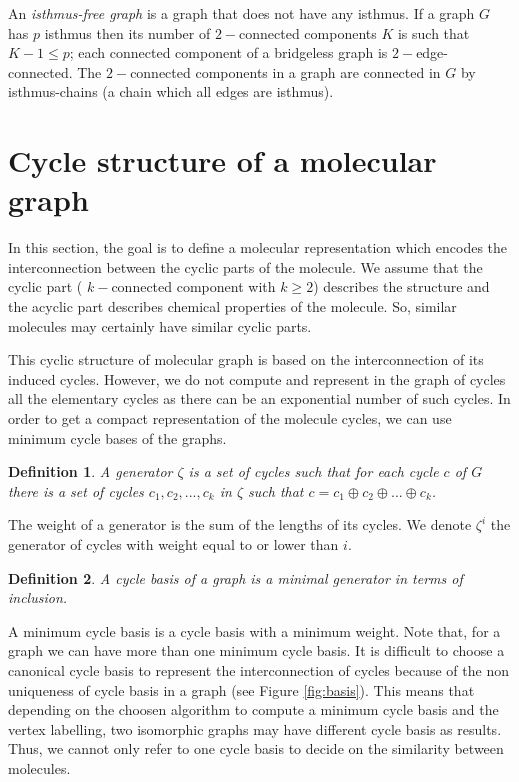 \documentclass[journal=jacsat,manuscript=article]{achemso}
\newtheorem{definition}{Definition}
\begin{document}
 An \textit{isthmus-free graph} is a graph that does not have any isthmus. If a graph $G$ has $p$ isthmus then its number of $2-$connected components $K$ is such that $K-1 \leq p$; each connected component of a bridgeless graph is $2-$edge-connected. The $2-$connected components in a graph are connected in $G$ by  isthmus-chains (a chain which all edges are isthmus).



\section{Cycle structure of a molecular graph}

 In this section, the goal is to define a molecular representation which encodes the interconnection between the cyclic parts of the molecule. We assume that the cyclic part ( $k-$connected component with $k \geq 2$) describes the structure and the acyclic part describes chemical properties of the molecule. So, similar molecules may certainly have similar cyclic parts. 

This cyclic structure of molecular graph is based on the interconnection of its induced cycles. However, we do not compute and represent in the graph of cycles all the elementary cycles as there can be an exponential number of such cycles. In order to get a compact representation of the molecule cycles, we can use minimum cycle bases\cite{Horton1987} of the graphs.

\begin{definition}
A generator $\zeta$ is a set of cycles such that for each cycle $c$ of $G$ there is a set of cycles $c_1,c_2,...,c_k$ in $ \zeta $ such that $c = c_1 \oplus c_2 \oplus  ... \oplus c_k$.
\end{definition}

The weight of a generator is the sum of the lengths of its cycles. We denote $\zeta^i$ the generator of cycles with weight equal to or lower than $i$.

\begin{definition} 
A cycle basis of a graph is a minimal generator in terms of inclusion. 
\end{definition}

A minimum cycle basis is a cycle basis with a minimum weight. Note that, for a graph  we can have more than one minimum cycle basis. It is difficult to choose a canonical cycle basis to represent the interconnection of cycles because of the non uniqueness of cycle basis in a graph (see Figure \ref{fig:basis}). This means that depending on the choosen algorithm to compute a minimum cycle basis and the vertex labelling, two isomorphic graphs may have different cycle basis as results. Thus, we cannot only refer to one cycle basis to decide on the similarity between molecules.
\end{document}
